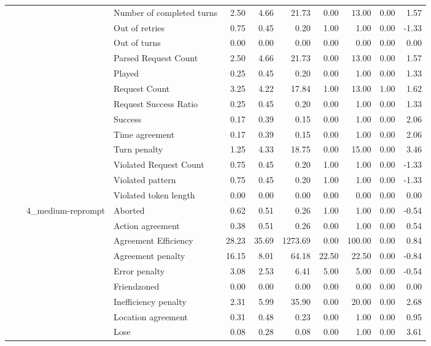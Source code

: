 \begin{tabular}{llllrrrrrrr}
 &  &  & Number of completed turns & 2.50 & 4.66 & 21.73 & 0.00 & 13.00 & 0.00 & 1.57 \\
 &  &  & Out of retries & 0.75 & 0.45 & 0.20 & 1.00 & 1.00 & 0.00 & -1.33 \\
 &  &  & Out of turns & 0.00 & 0.00 & 0.00 & 0.00 & 0.00 & 0.00 & 0.00 \\
 &  &  & Parsed Request Count & 2.50 & 4.66 & 21.73 & 0.00 & 13.00 & 0.00 & 1.57 \\
 &  &  & Played & 0.25 & 0.45 & 0.20 & 0.00 & 1.00 & 0.00 & 1.33 \\
 &  &  & Request Count & 3.25 & 4.22 & 17.84 & 1.00 & 13.00 & 1.00 & 1.62 \\
 &  &  & Request Success Ratio & 0.25 & 0.45 & 0.20 & 0.00 & 1.00 & 0.00 & 1.33 \\
 &  &  & Success & 0.17 & 0.39 & 0.15 & 0.00 & 1.00 & 0.00 & 2.06 \\
 &  &  & Time agreement & 0.17 & 0.39 & 0.15 & 0.00 & 1.00 & 0.00 & 2.06 \\
 &  &  & Turn penalty & 1.25 & 4.33 & 18.75 & 0.00 & 15.00 & 0.00 & 3.46 \\
 &  &  & Violated Request Count & 0.75 & 0.45 & 0.20 & 1.00 & 1.00 & 0.00 & -1.33 \\
 &  &  & Violated pattern & 0.75 & 0.45 & 0.20 & 1.00 & 1.00 & 0.00 & -1.33 \\
 &  &  & Violated token length & 0.00 & 0.00 & 0.00 & 0.00 & 0.00 & 0.00 & 0.00 \\
\cline{3-11}
 &  & \multirow[t]{27}{*}{4_medium-reprompt} & Aborted & 0.62 & 0.51 & 0.26 & 1.00 & 1.00 & 0.00 & -0.54 \\
 &  &  & Action agreement & 0.38 & 0.51 & 0.26 & 0.00 & 1.00 & 0.00 & 0.54 \\
 &  &  & Agreement Efficiency & 28.23 & 35.69 & 1273.69 & 0.00 & 100.00 & 0.00 & 0.84 \\
 &  &  & Agreement penalty & 16.15 & 8.01 & 64.18 & 22.50 & 22.50 & 0.00 & -0.84 \\
 &  &  & Error penalty & 3.08 & 2.53 & 6.41 & 5.00 & 5.00 & 0.00 & -0.54 \\
 &  &  & Friendzoned & 0.00 & 0.00 & 0.00 & 0.00 & 0.00 & 0.00 & 0.00 \\
 &  &  & Inefficiency penalty & 2.31 & 5.99 & 35.90 & 0.00 & 20.00 & 0.00 & 2.68 \\
 &  &  & Location agreement & 0.31 & 0.48 & 0.23 & 0.00 & 1.00 & 0.00 & 0.95 \\
 &  &  & Lose & 0.08 & 0.28 & 0.08 & 0.00 & 1.00 & 0.00 & 3.61 \\

\end{tabular}
